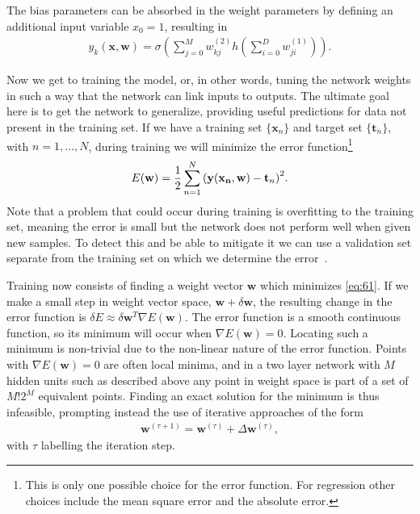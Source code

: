 \documentclass[11pt, a4paper]{report} %
\begin{document}
The bias parameters can be absorbed in the weight parameters by defining an additional input variable \(x_0=1\), resulting in 
\begin{align}
  y_k(\mathbf{x},\mathbf{w}) = \sigma\left(\sum_{j=0}^M w_{kj}^{(2)}h\left(\sum_{i=0}^D w_{ji}^{(1)}\right)\right).
\end{align}

Now we get to training the model, or, in other words, tuning the network weights in such a way that the network can link inputs to outputs.
The ultimate goal here is to get the network to generalize, providing useful predictions for data not present in the training set.
If we have a training set \(\{\mathbf{x}_n\}\) and target set \(\{\mathbf{t}_n\}\), with \(n=1,\ldots,N\), during training we will minimize the error function\footnote{This is only one possible choice for the error function. For regression other choices include the mean square error and the absolute error.}
\begin{align}
  \label{eq:61}
  E(\mathbf{w}) = \frac{1}{2} \sum _{n=1}^N{\qty(\mathbf{y}\qty(\mathbf{x_n}, \mathbf{w})-\mathbf{t}_n)}^2.
\end{align}
Note that a problem that could occur during training is overfitting to the training set, meaning the error is small but the network does not perform well when given new samples.
To detect this and be able to mitigate it we can use a validation set separate from the training set on which we determine the error~\cite{Bishop2006}.

Training now consists of finding a weight vector \(\mathbf{w}\) which minimizes \cref{eq:61}.
If we make a small step in weight vector space, \(\mathbf{w}+\delta\mathbf{w}\), the resulting change in the error function is \(\delta E \approx \delta \mathbf{w}^{T}\nabla E(\mathbf{w})\).
The error function is a smooth continuous function, so its minimum will occur when \(\nabla E(\mathbf{w})=0\).
Locating such a minimum is non-trivial due to the non-linear nature of the error function.
Points with \(\nabla E(\mathbf{w})=0\) are often local minima, and in a two layer network with \(M\) hidden units such as described above any point in weight space is part of a set of \(M!2^M\) equivalent points.
Finding an exact solution for the minimum is thus infeasible, prompting instead the use of iterative approaches of the form
\begin{align}
  \label{eq:62}
\mathbf{w}^{(\tau+1)}=\mathbf{w}^{(\tau)}+\Delta \mathbf{w}^{(\tau)},
\end{align}
with \(\tau\) labelling the iteration step.
\end{document}

